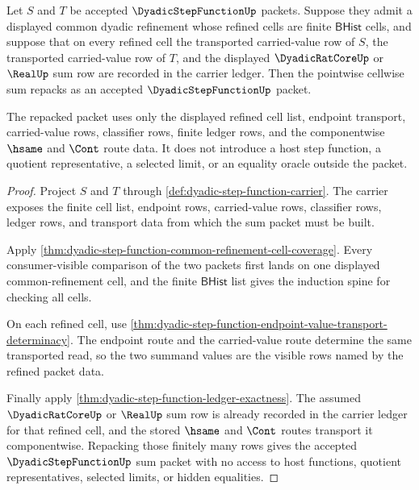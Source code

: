\begin{theorem}
\label{thm:dyadic-step-function-cellwise-sum-closure}
Let $S$ and $T$ be accepted $\DyadicStepFunctionUp$ packets. Suppose they admit a displayed common dyadic refinement whose refined cells are finite $\mathsf{BHist}$ cells, and suppose that on every refined cell the transported carried-value row of $S$, the transported carried-value row of $T$, and the displayed $\DyadicRatCoreUp$ or $\RealUp$ sum row are recorded in the carrier ledger. Then the pointwise cellwise sum repacks as an accepted $\DyadicStepFunctionUp$ packet.

The repacked packet uses only the displayed refined cell list, endpoint transport, carried-value rows, classifier rows, finite ledger rows, and the componentwise $\hsame$ and $\Cont$ route data. It does not introduce a host step function, a quotient representative, a selected limit, or an equality oracle outside the packet.
\end{theorem}
\begin{proof}
Project $S$ and $T$ through \autoref{def:dyadic-step-function-carrier}. The carrier exposes the finite cell list, endpoint rows, carried-value rows, classifier rows, ledger rows, and transport data from which the sum packet must be built.

Apply \autoref{thm:dyadic-step-function-common-refinement-cell-coverage}. Every consumer-visible comparison of the two packets first lands on one displayed common-refinement cell, and the finite $\mathsf{BHist}$ list gives the induction spine for checking all cells.

On each refined cell, use \autoref{thm:dyadic-step-function-endpoint-value-transport-determinacy}. The endpoint route and the carried-value route determine the same transported read, so the two summand values are the visible rows named by the refined packet data.

Finally apply \autoref{thm:dyadic-step-function-ledger-exactness}. The assumed $\DyadicRatCoreUp$ or $\RealUp$ sum row is already recorded in the carrier ledger for that refined cell, and the stored $\hsame$ and $\Cont$ routes transport it componentwise. Repacking those finitely many rows gives the accepted $\DyadicStepFunctionUp$ sum packet with no access to host functions, quotient representatives, selected limits, or hidden equalities.
\end{proof}

